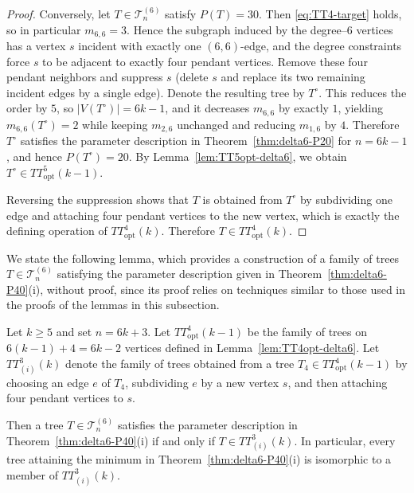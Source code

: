 \documentclass[preprint,12pt]{elsarticle}
\begin{document}
\begin{proof}
Conversely, let $T\in\mathcal{T}^{(6)}_n$ satisfy $P(T)=30$.
Then \eqref{eq:TT4-target} holds, so in particular $m_{6,6}=3$.
Hence the subgraph induced by the degree--$6$ vertices has a vertex $s$ incident
with exactly one $(6,6)$-edge, and the degree constraints force $s$ to be adjacent
to exactly four pendant vertices.
Remove these four pendant neighbors and suppress $s$ (delete $s$ and replace its
two remaining incident edges by a single edge).
Denote the resulting tree by $T^\circ$.
This reduces the order by $5$, so $|V(T^\circ)|=6k-1$, and it decreases $m_{6,6}$
by exactly $1$, yielding $m_{6,6}(T^\circ)=2$ while keeping $m_{2,6}$ unchanged and
reducing $m_{1,6}$ by $4$.
Therefore $T^\circ$ satisfies the parameter description in
Theorem~\ref{thm:delta6-P20} for $n=6k-1$, and hence $P(T^\circ)=20$.
By Lemma~\ref{lem:TT5opt-delta6}, we obtain $T^\circ\in TT^5_{\mathrm{opt}}(k-1)$.

Reversing the suppression shows that $T$ is obtained from $T^\circ$ by subdividing
one edge and attaching four pendant vertices to the new vertex, which is exactly
the defining operation of $TT^4_{\mathrm{opt}}(k)$.
Therefore $T\in TT^4_{\mathrm{opt}}(k)$.
\end{proof}







We state the following lemma, which provides a construction of a family of trees $T\in\mathcal{T}^{(6)}_n$ satisfying the parameter description given in Theorem~\ref{thm:delta6-P40}\textup{(i)}, without proof, since its proof relies on techniques similar to those used in the proofs of the lemmas in this subsection.





\begin{lemma}
\label{lem:TT3iopt-delta6}
Let $k\ge 5$ and set $n=6k+3$.
Let $TT^4_{\mathrm{opt}}(k-1)$ be the family of trees on $6(k-1)+4=6k-2$ vertices
defined in Lemma~\ref{lem:TT4opt-delta6}.
Let $TT^{3}_{(i)}(k)$ denote the family of trees obtained from a tree
$T_4\in TT^4_{\mathrm{opt}}(k-1)$ by choosing an edge $e$ of $T_4$, subdividing $e$
by a new vertex $s$, and then attaching four pendant vertices to $s$.

Then a tree $T\in\mathcal{T}^{(6)}_n$ satisfies the parameter description in
Theorem~\ref{thm:delta6-P40}\textup{(i)} if and only if $T\in TT^{3}_{(i)}(k)$.
In particular, every tree attaining the minimum in
Theorem~\ref{thm:delta6-P40}\textup{(i)} is isomorphic to a member of
$TT^{3}_{(i)}(k)$.
\end{lemma}
\end{document}
